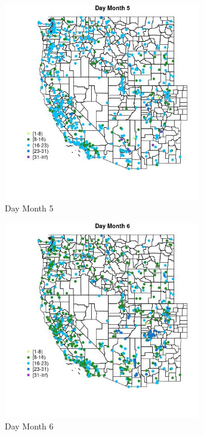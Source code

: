 \begin{figure} 
\centering  
\includegraphics[width=0.77\textwidth]{Code_Outputs/Report_ML_input_PM25_Step4_part_e_de_duplicated_aveswNAs_MapObsMo5Day.jpg} 
\caption{\label{fig:Report_ML_input_PM25_Step4_part_e_de_duplicated_aveswNAsMapObsMo5Day}Day Month 5} 
\end{figure} 
 

\clearpage 

\begin{figure} 
\centering  
\includegraphics[width=0.77\textwidth]{Code_Outputs/Report_ML_input_PM25_Step4_part_e_de_duplicated_aveswNAs_MapObsMo6Day.jpg} 
\caption{\label{fig:Report_ML_input_PM25_Step4_part_e_de_duplicated_aveswNAsMapObsMo6Day}Day Month 6} 
\end{figure} 
 

